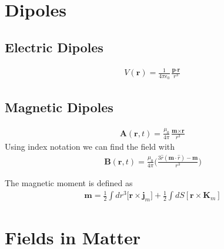 \section{Dipoles}

\subsection{Electric Dipoles}
\begin{align}
    V(\textbf{r}) = \frac{1}{4\pi\epsilon_0} \frac{\textbf{p}\cdot\textbf{r}}{r^3}
\end{align}

\subsection{Magnetic Dipoles}



\begin{align}
\textbf{A}(\textbf{r},t) = \frac{\mu_0}{4\pi}\frac{\textbf{m}\times\textbf{r}}{r^3} 
\end{align}
Using index notation we can find the field with
\begin{align}
    \textbf{B}(\textbf{r},t) = \frac{\mu_0}{4\pi}\Big(\frac{3\hat{r}(\textbf{m}\cdot\hat{r}) - \textbf{m}}{r^3}\Big)
\end{align}

The magnetic moment is defined as 
\begin{align}
    \textbf{m} = \frac{1}{2} \int dr^3 [\textbf{r}\times\textbf{j}_m\Big] + \frac{1}{2} \int dS [\textbf{r}\times\textbf{K}_m]
\end{align}


\section{Fields in Matter}

